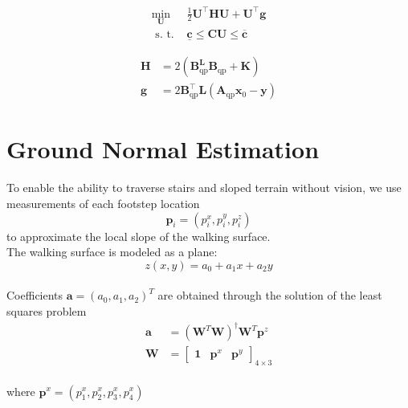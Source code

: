 \documentclass{article}
\begin{document}
$$
\begin{array}{lr}
    \min _{\mathbf{U}} & \frac{1}{2} \mathbf{U}^{\boldsymbol{\top}} \mathbf{H} \mathbf{U}+\mathbf{U}^{\boldsymbol{\top}} \mathbf{g} \\
    \text { s. t. } & \underline{\mathbf{c}} \leq \mathbf{C U} \leq \overline{\mathbf{c}}
\end{array}
$$

\begin{align}
    \mathbf{H} &=2\left(\mathbf{B}_{\mathrm{qp}}^{\boldsymbol{L}} \mathbf{\mathbf { B } _ { \mathrm { qp } }}+\mathbf{K}\right) \\
    \mathbf{g} &=2 \mathbf{B}_{\mathrm{qp}}^{\top} \mathbf{L}\left(\mathbf{A}_{\mathrm{qp}} \mathbf{x}_{0}-\mathbf{y}\right)
\end{align} 

\section{Ground Normal Estimation}

To enable the ability to traverse stairs and sloped terrain without vision, we use
measurements of each footstep location $$\boldsymbol{p}_i=(p^{x}_i, p^{y}_i, p^{z}_i)$$
to approximate the local slope of the walking surface.
\\
The walking surface is modeled as a plane:
$$
z(x, y)=a_{0}+a_{1} x+a_{2} y
$$
\\
Coefficients $\boldsymbol{a}=\left(a_{0}, a_{1}, a_{2}\right)^{T}$ are obtained through the solution of the least squares problem
$$
\begin{aligned}
\boldsymbol{a} &=\left(\boldsymbol{W}^{T} \boldsymbol{W}\right)^{\dagger} \boldsymbol{W}^{T} \boldsymbol{p}^{z} \\
\boldsymbol{W} &=\left[\begin{array}{lll}
\mathbf{1} & \boldsymbol{p}^{x} & \boldsymbol{p}^{y}
\end{array}\right]_{4 \times 3}
\end{aligned}
$$
\\
where $\boldsymbol{p}^{x}=(p^{x}_1, p^{x}_2, p^{x}_3, p^{x}_4)$
\end{document}
